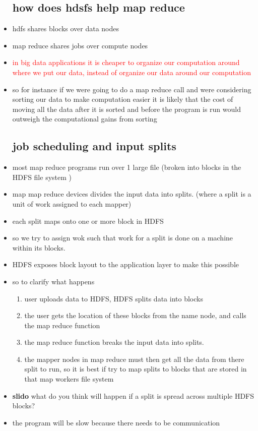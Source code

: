 \documentclass{article}
\begin{document}
\begin{itemize}
\subsection*{how does hdsfs help map reduce}
\item hdfs shares blocks over data nodes 
\item map reduce shares jobs over compute nodes
\item \textcolor{red}{in big data applications it is cheaper to organize our computation around where we put our data, instead of organize our data around our computation}
\item so for instance if we were going to do a map reduce call and were considering sorting our data to make computation easier it is likely that the cost of moving all the data after it is sorted and before the program is run would outweigh the computational gains from sorting
\subsection*{job scheduling and input splits}
\item most map reduce programs run over 1 large file (broken into blocks in the HDFS file system )
\item map map reduce devices divides the input data into splits. (where a split is a unit of work assigned to each mapper)
\item each split maps onto one or more block in HDFS
\item so we try to assign wok such that work for a split is done on a machine within its blocks. 
\item HDFS exposes block layout to the application layer to make this possible
\item so to clarify what happens 
\begin{enumerate}
    \item user uploads data to HDFS, HDFS splits data into blocks 
    \item the user gets the location of these blocks from the name node, and calls the map reduce function 
    \item the map reduce function breaks the input data into splits. 
    \item the mapper nodes in map reduce must then get all the data from there split to run, so it is best if try to map splits to blocks that are stored in that map workers file system 
\end{enumerate}
\item \textbf{slido} what do you think will happen if a split is spread across multiple HDFS blocks? 
\item the program will be slow because there needs to be communication

\end{itemize}
\end{document}
